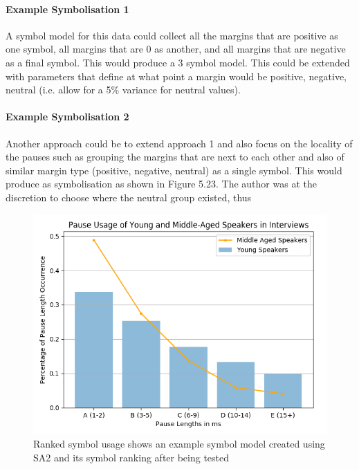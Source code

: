 \paragraph{Example Symbolisation 1}
A symbol model for this data could collect all the margins that are positive as one symbol, all margins that are 0 as another, and all margins that are negative as a final symbol. This would produce a 3 symbol model. This could be extended with parameters that define at what point a margin would be positive, negative, neutral (i.e. allow for a 5\% variance for neutral values). 


\paragraph{Example Symbolisation 2}
Another approach could be to extend approach 1 and also focus on the locality of the pauses such as grouping the margins that are next to each other and also of similar margin type (positive, negative, neutral) as a single symbol. This would produce as symbolisation as shown in Figure 5.23. The author was at the discretion to choose where the neutral group existed, thus 


\begin{figure}[htbp]
\begin{center}
\includegraphics[scale=0.7]{src/main-matter/methodology/symbolisation/dual_binary_pause_bar_chart}
\caption{Ranked symbol usage shows an example symbol model created using SA2 and its symbol ranking after being tested}
\label{default}
\end{center}
\end{figure}


